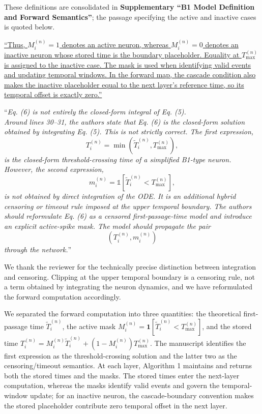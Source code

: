 \documentclass[12pt,technote,onecolumn]{IEEEtran}
\begin{document}
These definitions are consolidated in \textbf{Supplementary ``B1 Model Definition and Forward Semantics''}; the passage specifying the active and inactive cases is quoted below.

\uline{``Thus, $M_i^{(n)}=1$ denotes an active neuron, whereas $M_i^{(n)}=0$ denotes an inactive neuron whose stored time is the boundary placeholder. Equality at $T_{\max}^{(n)}$ is assigned to the inactive case. The mask is used when identifying valid events and updating temporal windows. In the forward map, the cascade condition also makes the inactive placeholder equal to the next layer's reference time, so its temporal offset is exactly zero.''}

\vspace{4mm}

``{\it Eq. (6) is not entirely the closed-form integral of Eq. (5).\\
Around lines 30--31, the authors state that Eq. (6) is the closed-form
solution obtained by integrating Eq. (5). This is not strictly correct.
The first expression,\
\[
T_i^{(n)} = \min\!\left(\widetilde{T}_i^{(n)}, T_{\max}^{(n)}\right),
\]
is the closed-form threshold-crossing time of a simplified B1-type
neuron. However, the second expression,\
\[
m_i^{(n)} = \mathbb{1}\!\left[\widetilde{T}_i^{(n)} < T_{\max}^{(n)}\right],
\]
is not obtained by direct integration of the ODE. It is an additional
hybrid censoring or timeout rule imposed at the upper temporal boundary.
The authors should reformulate Eq. (6) as a censored first-passage-time
model and introduce an explicit active-spike mask. The model should
propagate the pair\
\[
\left(T_i^{(n)}, m_i^{(n)}\right)
\]
through the network.}''
\vspace{1mm}


We thank the reviewer for the technically precise distinction between integration and censoring. Clipping at the upper temporal boundary is a censoring rule, not a term obtained by integrating the neuron dynamics, and we have reformulated the forward computation accordingly.

We separated the forward computation into three quantities: the
theoretical first-passage time \(\tilde{T}_i^{(n)}\), the active mask
\(M_i^{(n)}=\mathbf{1}[\tilde{T}_i^{(n)}<T_{\max}^{(n)}]\), and the
stored time
\(T_i^{(n)}=M_i^{(n)}\tilde{T}_i^{(n)}+(1-M_i^{(n)})T_{\max}^{(n)}\).
The manuscript identifies the first expression as the threshold-crossing
solution and the latter two as the censoring/timeout semantics.
At each layer, Algorithm 1 maintains and returns both the stored times and
the masks. The stored times enter the next-layer computation, whereas the
masks identify valid events and govern the temporal-window update; for an
inactive neuron, the cascade-boundary convention makes the stored placeholder
contribute zero temporal offset in the next layer.
\end{document}
